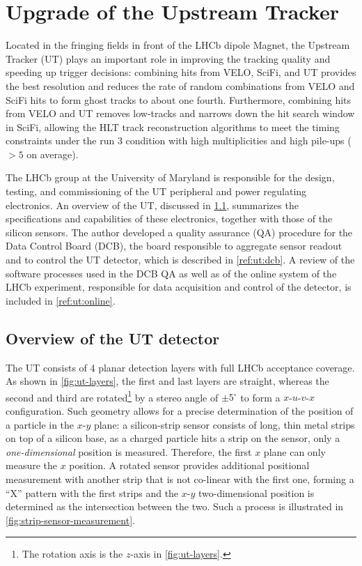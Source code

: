 \chapter{Upgrade of the Upstream Tracker}
\label{ref:ut}

Located in the fringing fields in front of the LHCb dipole Magnet,
the Upstream Tracker (UT) plays an important role in improving the tracking
quality and speeding up trigger decisions:
combining hits from VELO, SciFi, and UT provides the best \pt resolution
and reduces the rate of random combinations from VELO and SciFi hits to form
ghost tracks to about one fourth.
Furthermore, combining hits from VELO and UT removes low-\pt tracks and narrows
down the hit search window in SciFi, allowing the HLT track reconstruction
algorithms to meet the timing constraints under the run 3 condition
with high multiplicities and high pile-ups ($ > 5$ on average).

The LHCb group at the University of Maryland is responsible for the design,
testing, and commissioning of the UT peripheral and power regulating
electronics.
An overview of the UT, discussed in \cref{ref:ut:overview},
summarizes the specifications and capabilities of these electronics,
together with those of the silicon sensors.
The author developed a quality assurance (QA) procedure for
the Data Control Board (DCB),
the board responsible to aggregate sensor readout and to control the UT
detector,
which is described in \cref{ref:ut:dcb}.
A review of the software processes used in the DCB QA as well as of the online
system of the LHCb experiment,
responsible for data acquisition and control of the detector,
is included in \cref{ref:ut:online}.


\section{Overview of the UT detector}
\label{ref:ut:overview}

The UT consists of 4 planar detection layers with full LHCb acceptance coverage.
As shown in \cref{fig:ut-layers},
the first and last layers are straight,
whereas the second and third are rotated\footnote{
    The rotation axis is the $z$-axis in \cref{fig:ut-layers}.
} by a stereo angle of $\pm 5^\circ$
to form a $x$-$u$-$v$-$x$ configuration.
Such geometry allows for a precise determination of the position of a particle
in the $x$-$y$ plane:
a silicon-strip sensor consists of long, thin metal strips on top of a
silicon base, as a charged particle hits a strip on the sensor,
only a \emph{one-dimensional} position is measured.
Therefore, the first $x$ plane can only measure the $x$ position.
A rotated sensor provides additional positional measurement with another strip
that is not co-linear with the first one,
forming a ``X'' pattern with the first strips and
the $x$-$y$ two-dimensional position is determined as the intersection between
the two.
Such a process is illustrated in \cref{fig:strip-sensor-measurement}.

